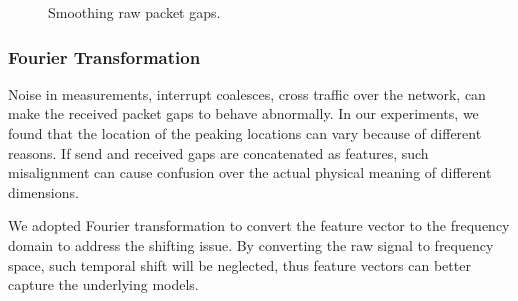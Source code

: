 \begin{figure}[htpb]
   \centering
   \quad
   \caption{Smoothing raw packet gaps.}
   \label{fig:smoothing}
\end{figure}

\subsubsection{Fourier Transformation}
\label{ssub:fourier_transformation}

Noise in measurements, interrupt coalesces, cross traffic over the network, can
make the received packet gaps to behave abnormally. In our experiments, we
found that the location of the peaking locations can vary because of different
reasons. If send and received gaps are concatenated as features, such
misalignment can cause confusion over the actual physical meaning of different
dimensions.

We adopted Fourier transformation to convert the feature vector to the
frequency domain to address the shifting issue. By converting the raw signal to
frequency space, such temporal shift will be neglected, thus feature vectors
can better capture the underlying models.

